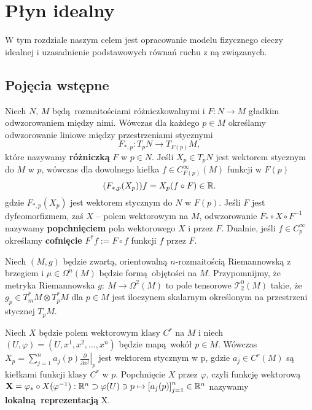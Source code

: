 \chapter{Płyn idealny} W tym rozdziale naszym celem jest opracowanie modelu fizycznego cieczy idealnej i uzasadnienie podstawowych równań ruchu z ną związanych.

\section{Pojęcia wstępne}

Niech \(N,\,M\) będą rozmaitościami różniczkowalnymi i \(F:N\to M\) gładkim odwzorowaniem między nimi. Wówczas dla każdego \(p\in M\) określamy odwzorowanie liniowe między przestrzeniami stycznymi 
\begin{equation}
F_{\ast, p}:T_p N\rightarrow T_{F(p)}M, 
\end{equation}
które nazywamy \textbf{różniczką} \(F\) w \(p\in N\). Jeśli \(X_p\in T_p N\) jest wektorem stycznym do \(M\) w \(p\), wówczas dla dowolnego kiełka \(f\in C_{F(p)}^\infty(M)\) funkcji w \(F(p)\) 
\begin{equation}
(F_{\ast, p} (X_p))f = X_p(f\circ F) \in \mathbb{R}.
\end{equation} 
gdzie \(F_{\ast, p} (X_p)\) jest wektorem stycznym do \(N\) w \(F(p)\). Jeśli \(F\) jest dyfeomorfizmem, zaś \(X\) -- polem wektorowym na \(M\), odwzorowanie \(F_\ast \circ X \circ F^{-1}\) nazywamy \textbf{popchnięciem} pola wektorowego \(X\) i przez \(F\). Dualnie, jeśli \(f\in C_p^\infty\) określamy \textbf{cofnięcie} \(F^\ast f := F\circ f\) funkcji \(f\) przez \(F\).

Niech \((M, g)\) będzie zwartą, orientowalną \(n\)-rozmaitością Riemannowską z brzegiem i \(\mu \in \Omega^n(M)\) będzie formą objętości na \(M\). Przypomnijmy, że metryka Riemannowska \(g:\: M \rightarrow \Omega^2(M)\) to pole tensorowe \(\mathcal{T}_2^0(M)\) takie, że \(g_p \in T_m^{\ast} M \otimes T_p^{\ast} M\) dla \(p\in M\) jest iloczynem skalarnym określonym na przestrzeni stycznej \(T_p M\).

Niech \(X\) będzie polem wektorowym klasy \(C^r\) na \(M\) i niech \((U, \varphi) = (U, x^1, x^2, \dots, x^n)\) będzie mapą wokół \(p\in M\). Wówczas \(X_p = \sum_{j=1}^{n}a_j(p)\left.\frac{\partial}{\partial x^j}\right|_p\) jest wektorem stycznym w p, gdzie \(a_j\in C^r(M)\) są kiełkami funkcji klasy \(C^r\) w \(p\). Popchnięcie \(X\) przez \(\varphi\), czyli funkcję wektorową \(\mathbf{X} = \varphi_{\ast}\circ X(\varphi^{-1}): \mathbb{R}^n \supset \varphi(U)\ni p \mapsto \left[a_j(p)\right]_{j=1}^n\in \mathbb{R}^n\) nazywamy \textbf{lokalną reprezentacją} X.

